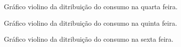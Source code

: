 \documentclass[	12pt, Times, openright, twoside, a4paper, english, brazil]{abntex2}
\begin{document}
                \begin{figure}[!ht]
                	\caption{Gráfico violino da ditribuição do consumo na quarta feira. \label{fig:case1_violinplot_quarta} }
                \end{figure}
                
                \begin{figure}[!ht]
                	\caption{Gráfico violino da ditribuição do consumo na quinta feira. \label{fig:case1_violinplot_quinta} }
                \end{figure}
                
                \begin{figure}[!ht]
                	\caption{Gráfico violino da ditribuição do consumo na sexta feira. \label{fig:case1_violinplot_sexta} }
                \end{figure}
\end{document}
